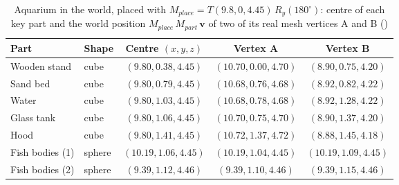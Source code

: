 \begin{table}[H]\centering\footnotesize
\caption{Aquarium in the world, placed with $M_{place}=T(9.8, 0, 4.45)\,R_y(180^\circ)$: centre of each key part and the world position $M_{place}\,M_{part}\,\mathbf{v}$ of two of its real mesh vertices A and B ()}\label{tab:world_aquarium}
\begin{tabular}{@{}l l c c c@{}}
\toprule
Part & Shape & Centre $(x,y,z)$ & Vertex A & Vertex B \\
\midrule
Wooden stand & cube & $(9.80, 0.38, 4.45)$ & $(10.70, 0.00, 4.70)$ & $(8.90, 0.75, 4.20)$ \\
Sand bed & cube & $(9.80, 0.79, 4.45)$ & $(10.68, 0.76, 4.68)$ & $(8.92, 0.82, 4.22)$ \\
Water & cube & $(9.80, 1.03, 4.45)$ & $(10.68, 0.78, 4.68)$ & $(8.92, 1.28, 4.22)$ \\
Glass tank & cube & $(9.80, 1.06, 4.45)$ & $(10.70, 0.75, 4.70)$ & $(8.90, 1.37, 4.20)$ \\
Hood & cube & $(9.80, 1.41, 4.45)$ & $(10.72, 1.37, 4.72)$ & $(8.88, 1.45, 4.18)$ \\
Fish bodies (1) & sphere & $(10.19, 1.06, 4.45)$ & $(10.19, 1.04, 4.45)$ & $(10.19, 1.09, 4.45)$ \\
Fish bodies (2) & sphere & $(9.39, 1.12, 4.46)$ & $(9.39, 1.10, 4.46)$ & $(9.39, 1.15, 4.46)$ \\
\bottomrule
\end{tabular}
\end{table}
